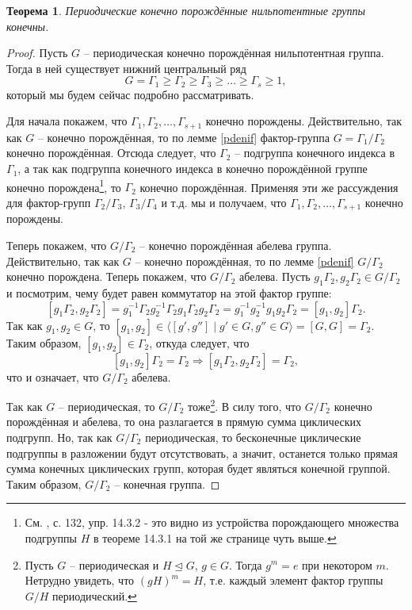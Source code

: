 \documentclass{article}
\newtheorem{theorem}{Теорема}[section]
\begin{document}
\begin{theorem} \label{ashkelon}
    Периодические конечно порождённые нильпотентные группы конечны.
\end{theorem}
\begin{proof}
    Пусть $G$ -- периодическая конечно порождённая нильпотентная группа. Тогда в ней существует нижний центральный ряд $$ G = \Gamma_1 \geqslant \Gamma_2 \geqslant \Gamma_3 \geqslant \ldots \geqslant \Gamma_s \geqslant 1, $$
    который мы будем сейчас подробно рассматривать.

    Для начала покажем, что $\Gamma_1, \Gamma_2, \ldots, \Gamma_{s + 1}$ конечно порождены. Действительно, так как $G$ -- конечно порождённая, то по лемме \ref{pdenif} фактор-группа $G = \Gamma_1 / \Gamma_2$ конечно порождённая. Отсюда следует, что $\Gamma_2$ -- подгруппа конечного индекса в $\Gamma_1$, а так как подгруппа конечного индекса в конечно порождённой группе конечно порождена\footnote{См. \cite{kargapolov}, с. 132, упр. 14.3.2 - это видно из устройства порождающего множества подгруппы $H$ в теореме 14.3.1 на той же странице чуть выше.}, то $\Gamma_2$ конечно порождённая. Применяя эти же рассуждения для фактор-групп $\Gamma_2 / \Gamma_3$, $\Gamma_3 / \Gamma_4$ и т.д. мы и получаем, что $\Gamma_1, \Gamma_2, \ldots, \Gamma_{s + 1}$ конечно порождены.

    Теперь покажем, что $G / \Gamma_2$ -- конечно порождённая абелева группа. Действительно, так как $G$ -- конечно порождённая, то по лемме \ref{pdenif} $G / \Gamma_2$ конечно порождена. Теперь покажем, что $G / \Gamma_2$ абелева. Пусть $g_1 \Gamma_2, g_2 \Gamma_2 \in G / \Gamma_2$ и посмотрим, чему будет равен коммутатор на этой фактор группе:
    \[
        [g_1 \Gamma_2, g_2 \Gamma_2] = g_1^{-1} \Gamma_2 g_2^{-1} \Gamma_2 g_1 \Gamma_2 g_2 \Gamma_2 = g_1^{-1} g_2^{-1} g_1 g_2 \Gamma_2 = [g_1, g_2] \Gamma_2.
    \]
    Так как $g_1, g_2 \in G $, то $ [g_1, g_2] \in \langle [g', g''] \mid g' \in G, g'' \in G \rangle = [G, G] = \Gamma_2$. Таким образом, $[g_1, g_2] \in \Gamma_2$, откуда следует, что
    \[
        [g_1, g_2] \Gamma_2 = \Gamma_2 \Rightarrow [g_1 \Gamma_2, g_2 \Gamma_2] = \Gamma_2,
    \]
    что и означает, что $G/ \Gamma_2$ абелева.

    Так как $G$ -- периодическая, то $G / \Gamma_2$ тоже\footnote{Пусть $G$ -- периодическая и $H \trianglelefteq G$, $g \in G$. Тогда $g^m = e$ при некотором $m$. Нетрудно увидеть, что $(g H)^{m} = H$, т.е. каждый элемент фактор группы $G/H$ периодический.}. В силу того, что $G / \Gamma_2$ конечно порождённая и абелева, то она разлагается в прямую сумма циклических подгрупп. Но, так как $G / \Gamma_2$ периодическая, то бесконечные циклические подгруппы в разложении будут отсутствовать, а значит, останется только прямая сумма конечных циклических групп, которая будет являться конечной группой. Таким образом, $G / \Gamma_2$ -- конечная группа.


\end{proof}
\end{document}
